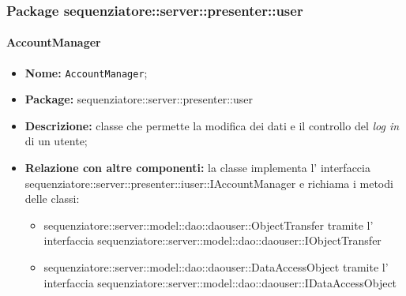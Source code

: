\subsubsection{Package sequenziatore::server::presenter::user}
\paragraph{AccountManager}
	\begin{itemize}
		\item \textbf{Nome:} \texttt{AccountManager};
		\item \textbf{Package:} sequenziatore::server::presenter::user
		\item \textbf{Descrizione:} classe che permette la modifica dei dati e il controllo del \textit{log in} di un utente;
		\item \textbf{Relazione con altre componenti:} la classe implementa l' interfaccia sequenziatore::server::presenter::iuser::IAccountManager e richiama i metodi delle classi:
		\begin{itemize}
			\item sequenziatore::server::model::dao::daouser::ObjectTransfer tramite l' interfaccia sequenziatore::server::model::dao::daouser::IObjectTransfer
			\item sequenziatore::server::model::dao::daouser::DataAccessObject tramite l' interfaccia sequenziatore::server::model::dao::daouser::IDataAccessObject
		\end{itemize}
	\end{itemize}
